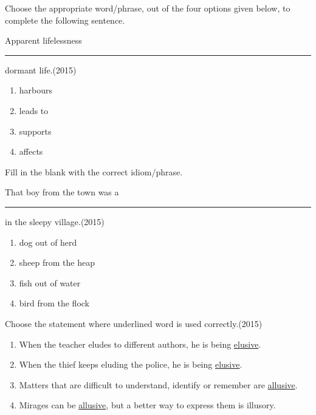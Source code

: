 \iffalse
\chapter{2015}
\author{AI24BTECH11022}
\section{ae}
\fi

\item Choose the appropriate word/phrase, out of the four options given below, to complete the following sentence.

Apparent lifelessness \rule{1cm}{0.15mm} dormant life.\hfill(2015)
\begin{multicols}{2}
\begin{enumerate}
\item harbours
\item leads to
\item supports
\item affects
\end{enumerate}
\end{multicols}


\item Fill in the blank with the correct idiom/phrase.

That boy from the town was a \rule{1cm}{0.15mm} in the sleepy village.\hfill(2015)
\begin{multicols}{2}
\begin{enumerate}
\item dog out of herd
\item sheep from the heap
\item fish out of water
\item bird from the flock
\end{enumerate}
\end{multicols}


\item Choose the statement where underlined word is used correctly.\hfill(2015)
\begin{enumerate}
\item When the teacher eludes to different authors, he is being \underline{elusive}.
\item When the thief keeps eluding the police, he is being \underline{elusive}.
\item Matters that are difficult to understand, identify or remember are \underline{allusive}.
\item Mirages can be \underline{allusive}, but a better way to express them is illusory.
\end{enumerate}


